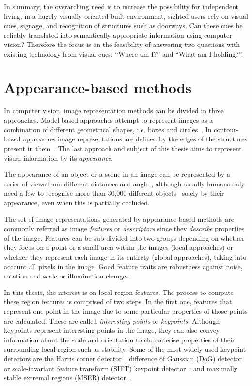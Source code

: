 In summary, the overarching need is to increase the possibility for independent living; in a hugely visually-oriented built environment, sighted users rely on visual cues, signage, and recognition of structures such as doorways.  Can these cues be reliably translated into semantically appropriate information using computer vision? Therefore the focus is on the feasibility of answering two questions with existing technology from visual cues: ``Where am I?'' and ``What am I holding?''. 


\section{Appearance-based methods}

In computer vision, image representation methods can be divided in three approaches. Model-based approaches attempt to represent images as a combination of different geometrical shapes, i.e. boxes and circles~\cite{biederman1987}. In contour-based approaches image representations are defined by the edges of the structures present in them~\cite{canny1986computational}. The last approach and subject of this thesis aims to represent visual information by its \textit{appearance}. 

The appearance of an object or a scene in an image can be represented by a series of views from different distances and angles, although usually humans only need a few to recognise more than 30,000 different objects~\cite{biederman1987recognition} solely by their appearance, even when this is partially occluded. 

The set of image representations generated by appearance-based methods are commonly referred as image \textit{features} or \textit{descriptors} since they \textit{describe} properties of the image. Features can be sub-divided into two groups depending on whether they focus on a point or a small area within the images (local approaches) or whether they represent each image in its entirety (global approaches), taking into account all pixels in the image. Good feature traits are robustness against noise, rotation and scale or illumination changes. 

In this thesis, the interest is on local region features. The process to compute these region features is comprised of two steps. In the first one, features that represent one point in the image due to some particular properties of those points are calculated. These are called \textit{interesting points} or \textit{keypoints}. Although keypoints represent interesting points in the image, they can also convey information about the scale and orientation to characterise properties of their
surrounding local region such as stability. Some of the most widely used keypoint detectors are the Harris corner detector~\cite{harris1988combined}, difference of Gaussian (DoG) detector or scale-invariant feature transform (SIFT) keypoint detector~\cite{lowe2004distinctive}; and maximally stable extremal regions (MSER) detector~\cite{matas2004robust}.

